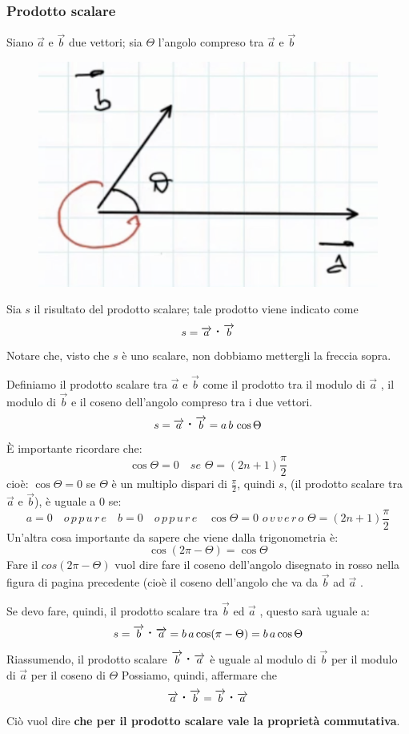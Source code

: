 \subsubsection{Prodotto scalare}
Siano $ \overrightarrow{a} $ e $ \overrightarrow{b} $ due vettori; sia $ \Theta $ l'angolo compreso tra $ \overrightarrow{a} $ e $ \overrightarrow{b} $

\begin{figure}[h]
\begin{center}
\includegraphics[width = 0.5 \textwidth]{lezione1/images/scalare1}
\label{fig:scalare1}
\end{center}
\end{figure}

Sia $ s $ il risultato del prodotto scalare; tale prodotto viene indicato come
$$ s = \overrightarrow{a} \prodscal \overrightarrow{b} $$
Notare che, visto che $s$ è uno scalare, non dobbiamo mettergli la freccia sopra.

Definiamo il prodotto scalare tra $ \overrightarrow{a} $ e $\overrightarrow{b} $ come il prodotto tra il modulo di $\overrightarrow{a} $ , il modulo di $ \overrightarrow{b} $ e il coseno dell'angolo compreso tra i due vettori.
$$ s = \overrightarrow{a} \prodscal \overrightarrow{b} = a \, b \, \cos \Theta $$
È importante ricordare che:
$$ \cos \Theta = 0 \quad  se \, \,  \Theta = (2 n + 1) \frac{\pi}{2} $$
cioè: $ \cos \Theta = 0 $ se $ \Theta $ è un multiplo dispari di $ \frac{\pi}{2} $, quindi $s$, (il prodotto scalare tra $\overrightarrow{a}$ e $\overrightarrow{b}$), è uguale a 0 se:
$$ a = 0 \quad o\,p\,p\,u\,r\,e \quad b = 0 \quad o\,p\,p\,u\,r\,e \quad \cos \Theta = 0 \, \, o\,v\,v\,e\,r\,o \,\,\Theta = (2n+1) \frac{\pi}{2} $$
Un'altra cosa importante da sapere che viene dalla trigonometria è:
$$ \cos(2 \pi - \Theta) = \cos \Theta $$
Fare il $ cos(2 \pi - \Theta) $ vuol dire fare il coseno dell'angolo disegnato in rosso nella figura di pagina precedente (cioè il coseno dell'angolo che va da $\overrightarrow{b} $ ad $\overrightarrow{a} $ .

Se devo fare, quindi, il prodotto scalare tra $ \overrightarrow{b} $ ed $ \overrightarrow{a} $ , questo sarà uguale a:
$$ s = \overrightarrow{b} \prodscal \overrightarrow{a} = b\, a \cos(\pi - \Theta) = b \, a \cos \Theta $$
Riassumendo,  il prodotto scalare $\overrightarrow{b} \prodscal \overrightarrow{a} $ è uguale al modulo di $\overrightarrow{b}$ per il modulo di $ \overrightarrow{a} $ per il coseno di $ \Theta $
Possiamo, quindi,  affermare che
$$ \overrightarrow{a} \prodscal \overrightarrow{b} = \overrightarrow{b} \prodscal \overrightarrow{a} $$ 
Ciò vuol dire \textbf{che per il prodotto scalare vale la proprietà commutativa}.  \\


